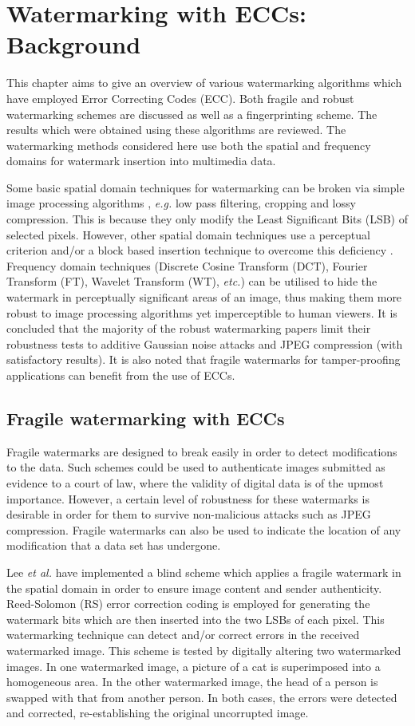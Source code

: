 \documentclass[12pt]{report}
\begin{document}
\chapter{Watermarking with ECCs: Background}
\label{chapter:eccB4}
This chapter aims to give an overview of various 
watermarking algorithms which have employed Error Correcting Codes (ECC). 
Both fragile and robust watermarking schemes are discussed as well as a fingerprinting scheme. 
The results which were obtained using these algorithms are reviewed. 
The watermarking methods considered here use both the spatial and 
frequency domains for watermark insertion into 
multimedia data.

Some basic spatial domain techniques for watermarking can be broken via simple image processing algorithms \cite{ECCb4:book}, \emph{e.g.}
low pass filtering, cropping and lossy compression. This is because they only modify the Least Significant Bits (LSB)
of selected pixels.
However, other spatial domain techniques use a perceptual criterion 
and/or a block based insertion technique to overcome this deficiency \cite{ECCb4:darm1, ECCb4:darm2}. 
Frequency domain techniques (Discrete Cosine Transform (DCT), Fourier Transform (FT), 
Wavelet Transform (WT), \emph{etc.}) can be utilised to hide 
the watermark in perceptually significant areas \cite{cox1} of an image, 
thus making them more robust
to image processing algorithms yet imperceptible to human viewers.
It is concluded that the majority of the robust watermarking papers limit their robustness tests 
to additive Gaussian noise attacks and JPEG compression (with satisfactory results). 
It is also noted that fragile watermarks for tamper-proofing applications can benefit from the use of ECCs.

\section{Fragile watermarking with ECCs}
Fragile watermarks are designed to break easily in order to detect modifications to the data.
Such schemes could be used to authenticate images submitted as evidence to a court of law, where the 
validity of digital data is of the upmost importance.
However, a certain level of robustness for these watermarks is desirable in order for them to
survive non-malicious attacks such as JPEG compression. Fragile watermarks can also be used to indicate
the location of any modification that a data set has undergone.  

Lee \emph{et al.} \cite{ECCb4:lee} have implemented a blind scheme which applies a fragile watermark in the spatial domain
in order to ensure image content and sender authenticity. 
Reed-Solomon (RS) error correction coding is 
employed for generating the watermark bits which are then inserted into the two LSBs of each pixel. 
This watermarking technique can detect and/or correct errors in the received watermarked image.
This scheme is tested by digitally altering
two watermarked images. 
In one watermarked image, a picture of a cat is superimposed into a homogeneous area. In the other watermarked image,
the head of a person is swapped with that from another person.
In both cases,
the errors were detected and corrected, 
re-establishing the original uncorrupted image.
\end{document}
